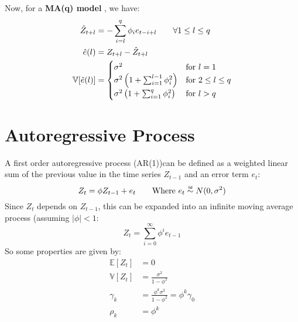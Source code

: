 Now, for a \textbf{MA(q) model} , we have:
\begin{equation*}
    \begin{aligned}
        \hat{Z}_{t+l} &= - \sum_{i=l}^{q} \phi_i e_{t-i+l} \qquad \forall 1 
        \le l \le q \\
        \hat{e}(l) &= Z_{t+l} - \hat{Z}_{t+l} \\
            \mathbb{V}[ \hat{e}(l)] &= \begin{cases}
            \sigma^2 & \text{for $l=1$}\\
            \sigma^2 \left( 1 + \sum_{i=1}^{l-1} \phi_i^2 \right)& \text{for $
            2 \le l \le q$}\\
            \sigma^2 \left( 1 + \sum_{i=1}^{q} \phi_i^2 \right)& \text{for $l >
            q$}\\
        \end{cases}
    \end{aligned}
\end{equation*}


\section{Autoregressive Process}
A first order autoregressive process (AR(1))can be defined as a weighted linear
sum of the previous value in the time series $Z_{t-1}$ and an error term
$e_{t}$:
\begin{equation*}
    Z_t = \phi Z_{t - 1} + e_{t} \qquad \text{Where $e_t \iid N(0, \sigma^2)$}
\end{equation*}
Since $Z_{t}$ depends on $Z_{t-1}$, this can be expanded into an infinite
moving average process (assuming $|\phi| < 1$:
\begin{equation*}
    Z_{t} = \sum_{i=0}^{\infty} \phi^{i} e_{t-1}
\end{equation*}
So some properties are given by:
\begin{equation*}
    \begin{aligned}
        \mathbb{E}[Z_{t}] &= 0 \\
        \mathbb{V}[Z_{t}] &= \frac{\sigma^{2}}{1 - \phi^{2}}\\
        \gamma_{k} &= \frac{\phi^{k}\sigma^{2}}{1-\phi^{2}} = \phi^{k}
        \gamma_0  \\
        \rho_{k} &= \phi^{k} \\
    \end{aligned}
\end{equation*}

